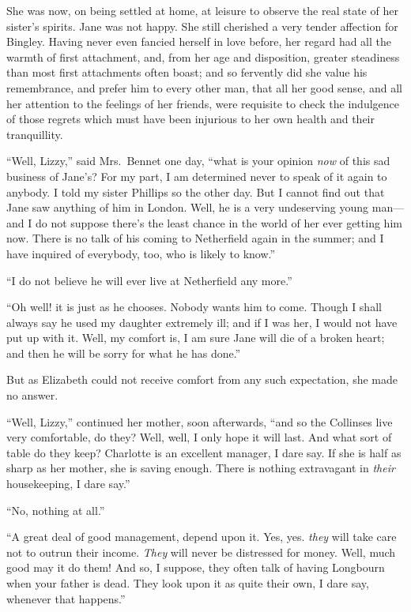 She was now, on being settled at home, at leisure to observe the
real state of her sister's spirits.  Jane was not happy.  She still
cherished a very tender affection for Bingley.  Having never even
fancied herself in love before, her regard had all the warmth of
first attachment, and, from her age and disposition, greater
steadiness than most first attachments often boast; and so
fervently did she value his remembrance, and prefer him to every
other man, that all her good sense, and all her attention to the
feelings of her friends, were requisite to check the indulgence of
those regrets which must have been injurious to her own health
and their tranquillity.

``Well, Lizzy,'' said Mrs.\ Bennet one day, ``what is your opinion
\emph{now} of this sad business of Jane's?  For my part, I am
determined never to speak of it again to anybody.  I told my
sister Phillips so the other day.  But I cannot find out that Jane
saw anything of him in London.  Well, he is a very undeserving
young man---and I do not suppose there's the least chance in the
world of her ever getting him now.  There is no talk of his
coming to Netherfield again in the summer; and I have inquired
of everybody, too, who is likely to know.''

``I do not believe he will ever live at Netherfield any more.''

``Oh well! it is just as he chooses.  Nobody wants him to come.
Though I shall always say he used my daughter extremely ill; and
if I was her, I would not have put up with it.  Well, my comfort
is, I am sure Jane will die of a broken heart; and then he will
be sorry for what he has done.''

But as Elizabeth could not receive comfort from any such
expectation, she made no answer.

``Well, Lizzy,'' continued her mother, soon afterwards, ``and so
the Collinses live very comfortable, do they?  Well, well, I only
hope it will last.  And what sort of table do they keep?  Charlotte
is an excellent manager, I dare say.  If she is half as sharp as
her mother, she is saving enough.  There is nothing extravagant in
\emph{their} housekeeping, I dare say.''

``No, nothing at all.''

``A great deal of good management, depend upon it.  Yes, yes.
\emph{they} will take care not to outrun their income.  \emph{They} will
never be distressed for money.  Well, much good may it do
them!  And so, I suppose, they often talk of having Longbourn
when your father is dead.  They look upon it as quite their own,
I dare say, whenever that happens.''

